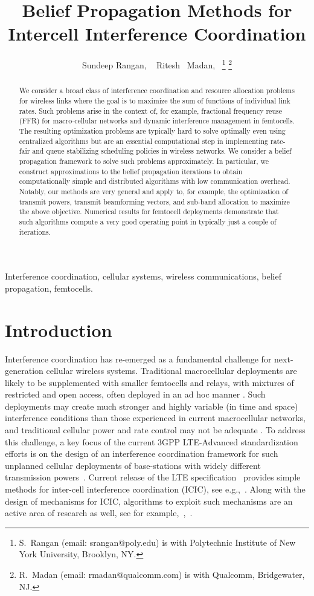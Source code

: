\documentclass[letterpaper,twocolumn,twoside]{IEEEtran}
\title{Belief Propagation Methods for Intercell Interference Coordination}
\author{Sundeep Rangan, ~\IEEEmembership{Member,~IEEE,}
        Ritesh \ Madan,~\IEEEmembership{Member,~IEEE}
\thanks{S.\ Rangan (email: srangan@poly.edu) is with
        Polytechnic Institute of New York University, Brooklyn, NY.}
\thanks{R.\ Madan (email: rmadan@qualcomm.com) is with
        Qualcomm, Bridgewater, NJ.}
}
\begin{document}
\setcounter{page}{1}

\maketitle
\begin{abstract}
We consider a broad class of interference coordination and resource
allocation problems for wireless links where the goal is to maximize
the sum of functions of individual link rates. Such problems arise
in the context of, for example, fractional frequency reuse (FFR) for
macro-cellular networks and dynamic interference management in
femtocells. The resulting optimization problems are typically hard
to solve optimally even using centralized algorithms but are an
essential computational step in implementing rate-fair and queue
stabilizing scheduling policies in wireless networks. We consider a
belief propagation framework to solve such problems approximately.
In particular, we construct approximations to the belief propagation
iterations to obtain computationally simple and distributed
algorithms with low communication overhead. Notably, our methods are
very general and apply to, for example, the optimization of transmit
powers, transmit beamforming vectors, and sub-band allocation to
maximize the above objective. Numerical results for femtocell
deployments demonstrate that such algorithms compute a very good
operating point in typically just a couple of iterations.
\end{abstract}

\begin{keywords} Interference coordination, cellular systems,
wireless communications, belief propagation, femtocells.
\end{keywords}




\section{Introduction}
Interference coordination has re-emerged as a fundamental challenge
for next-generation cellular wireless systems. Traditional
macrocellular deployments are likely to be supplemented with smaller
femtocells and relays, with mixtures of restricted and open access,
often deployed in an ad hoc manner \cite{ChaAndG:08,LopezVRZ:09}.
Such deployments may create much stronger and highly variable (in
time and space) interference conditions than those experienced in
current macrocellular networks, and traditional cellular power and
rate control may not be adequate \cite{FemtoForum:10}. To address
this challenge, a key focus of the current 3GPP LTE-Advanced
standardization efforts is on the design of an interference
coordination framework for such unplanned cellular deployments of
base-stations with widely different transmission
powers~\cite{3GPPICIC}. Current release of the LTE
specification~\cite{3GPP36.300} provides simple methods for inter-cell
interference coordination (ICIC), see e.g.,~\cite{fodor_2009}. Along
with the design of mechanisms for ICIC, algorithms to exploit such
mechanisms are an active area of research as well, see for
example,~\cite{kang_2008},~\cite{sundaresan_2008}.
\end{document}
